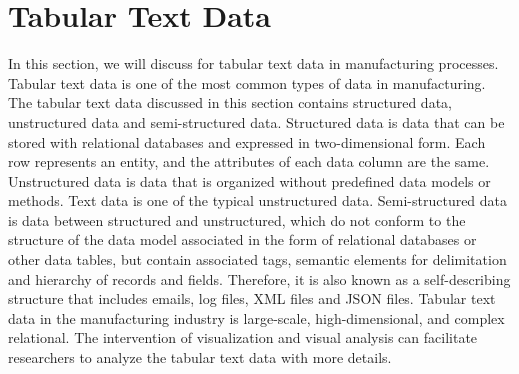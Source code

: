 \documentclass[a4paper,fleqn]{cas-dc}
\begin{document}
\section{Tabular Text Data}
In this section, we will discuss for tabular text data in manufacturing processes.
Tabular text data is one of the most common types of data in manufacturing. The tabular text data discussed in this section contains structured data, unstructured data and semi-structured data.
Structured data is data that can be stored with relational databases and expressed in two-dimensional form. Each row represents an entity, and the attributes of each data column are the same.
Unstructured data is data that is organized without predefined data models or methods. Text data is one of the typical unstructured data.
Semi-structured data is data between structured and unstructured, which do not conform to the structure of the data model associated in the form of relational databases or other data tables, but contain associated tags, semantic elements for delimitation and hierarchy of records and fields. Therefore, it is also known as a self-describing structure that includes emails, log files, XML files and JSON files.
Tabular text data in the manufacturing industry is large-scale, high-dimensional, and complex relational. The intervention of visualization and visual analysis can facilitate researchers to analyze the tabular text data with more details.


\end{document}
